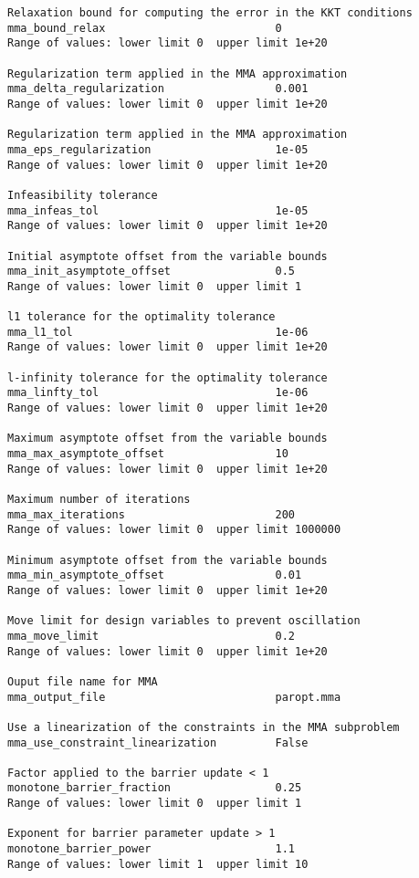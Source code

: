 \documentclass[12pt]{article}
\begin{document}
{\begin{verbatim}
Relaxation bound for computing the error in the KKT conditions
mma_bound_relax                          0
Range of values: lower limit 0  upper limit 1e+20

Regularization term applied in the MMA approximation
mma_delta_regularization                 0.001
Range of values: lower limit 0  upper limit 1e+20

Regularization term applied in the MMA approximation
mma_eps_regularization                   1e-05
Range of values: lower limit 0  upper limit 1e+20

Infeasibility tolerance
mma_infeas_tol                           1e-05
Range of values: lower limit 0  upper limit 1e+20

Initial asymptote offset from the variable bounds
mma_init_asymptote_offset                0.5
Range of values: lower limit 0  upper limit 1

l1 tolerance for the optimality tolerance
mma_l1_tol                               1e-06
Range of values: lower limit 0  upper limit 1e+20

l-infinity tolerance for the optimality tolerance
mma_linfty_tol                           1e-06
Range of values: lower limit 0  upper limit 1e+20

Maximum asymptote offset from the variable bounds
mma_max_asymptote_offset                 10
Range of values: lower limit 0  upper limit 1e+20

Maximum number of iterations
mma_max_iterations                       200
Range of values: lower limit 0  upper limit 1000000

Minimum asymptote offset from the variable bounds
mma_min_asymptote_offset                 0.01
Range of values: lower limit 0  upper limit 1e+20

Move limit for design variables to prevent oscillation
mma_move_limit                           0.2
Range of values: lower limit 0  upper limit 1e+20

Ouput file name for MMA
mma_output_file                          paropt.mma

Use a linearization of the constraints in the MMA subproblem
mma_use_constraint_linearization         False

Factor applied to the barrier update < 1
monotone_barrier_fraction                0.25
Range of values: lower limit 0  upper limit 1

Exponent for barrier parameter update > 1
monotone_barrier_power                   1.1
Range of values: lower limit 1  upper limit 10


\end{verbatim}}
\end{document}
